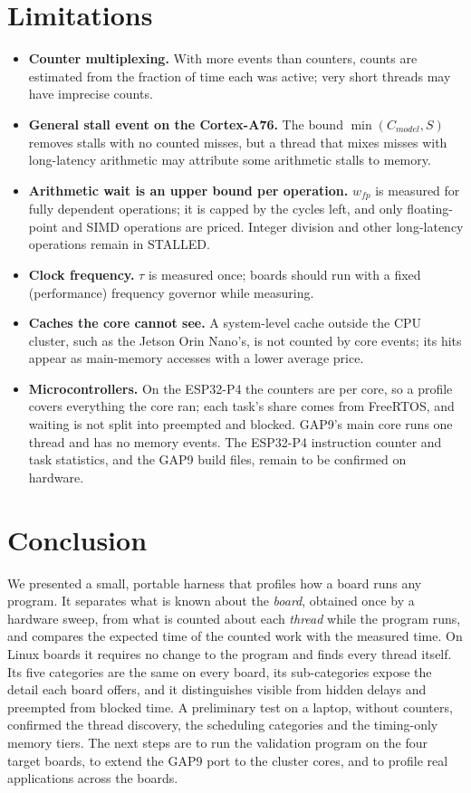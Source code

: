 \documentclass[10pt,a4paper,twocolumn]{article}
\begin{document}
\section{Limitations}
\begin{itemize}
  \item \textbf{Counter multiplexing.} With more events than counters, counts are estimated from the fraction of time each was active; very short threads may have imprecise counts.
  \item \textbf{General stall event on the Cortex-A76.} The bound $\min(C_{model},S)$ removes stalls with no counted misses, but a thread that mixes misses with long-latency arithmetic may attribute some arithmetic stalls to memory.
  \item \textbf{Arithmetic wait is an upper bound per operation.} $w_{fp}$ is measured for fully dependent operations; it is capped by the cycles left, and only floating-point and SIMD operations are priced. Integer division and other long-latency operations remain in STALLED.
  \item \textbf{Clock frequency.} $\tau$ is measured once; boards should run with a fixed (performance) frequency governor while measuring.
  \item \textbf{Caches the core cannot see.} A system-level cache outside the CPU cluster, such as the Jetson Orin Nano's, is not counted by core events; its hits appear as main-memory accesses with a lower average price.
  \item \textbf{Microcontrollers.} On the ESP32-P4 the counters are per core, so a profile covers everything the core ran; each task's share comes from FreeRTOS, and waiting is not split into preempted and blocked. GAP9's main core runs one thread and has no memory events. The ESP32-P4 instruction counter and task statistics, and the GAP9 build files, remain to be confirmed on hardware.
\end{itemize}

\section{Conclusion}
We presented a small, portable harness that profiles how a board runs any program. It separates what is known about the \emph{board}, obtained once by a hardware sweep, from what is counted about each \emph{thread} while the program runs, and compares the expected time of the counted work with the measured time. On Linux boards it requires no change to the program and finds every thread itself. Its five categories are the same on every board, its sub-categories expose the detail each board offers, and it distinguishes visible from hidden delays and preempted from blocked time. A preliminary test on a laptop, without counters, confirmed the thread discovery, the scheduling categories and the timing-only memory tiers. The next steps are to run the validation program on the four target boards, to extend the GAP9 port to the cluster cores, and to profile real applications across the boards.
\end{document}
